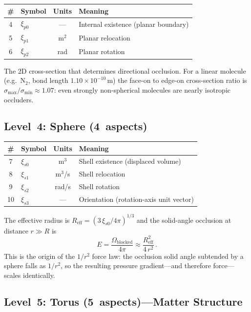 \begin{center}
\begin{tabular}{clcl}
\hline
\# & Symbol & Units & Meaning \\
\hline
4 & $\xi_{p0}$ & --- & Internal existence (planar boundary) \\
5 & $\xi_{p1}$ & m$^{2}$ & Planar relocation \\
6 & $\xi_{p2}$ & rad & Planar rotation \\
\hline
\end{tabular}
\end{center}

The 2D cross-section that determines directional occlusion.  For a linear molecule (e.g.\ N$_2$, bond length $1.10\times10^{-10}$\,m) the face-on to edge-on cross-section ratio is $\sigma_{\max}/\sigma_{\min} \approx 1.07$: even strongly non-spherical molecules are nearly isotropic occluders.


\subsection{Level~4: Sphere (4~aspects)}

\begin{center}
\begin{tabular}{clcl}
\hline
\# & Symbol & Units & Meaning \\
\hline
7  & $\xi_{s0}$ & m$^{3}$ & Shell existence (displaced volume) \\
8  & $\xi_{s1}$ & m$^{3}$/s & Shell relocation \\
9  & $\xi_{s2}$ & rad/s & Shell rotation \\
10 & $\xi_{s3}$ & --- & Orientation (rotation-axis unit vector) \\
\hline
\end{tabular}
\end{center}

The effective radius is $R_{\text{eff}} = (3\,\xi_{s0}/4\pi)^{1/3}$ and the solid-angle occlusion at distance $r \gg R$ is
\begin{equation}\label{eq:E-sphere}
  E = \frac{\Omega_{\text{blocked}}}{4\pi} \approx \frac{R_{\text{eff}}^2}{4\,r^2}\,.
\end{equation}
This is the origin of the $1/r^2$ force law: the occlusion solid angle subtended by a sphere falls as $1/r^2$, so the resulting pressure gradient---and therefore force---scales identically.


\subsection{Level~5: Torus (5~aspects)---Matter Structure}

